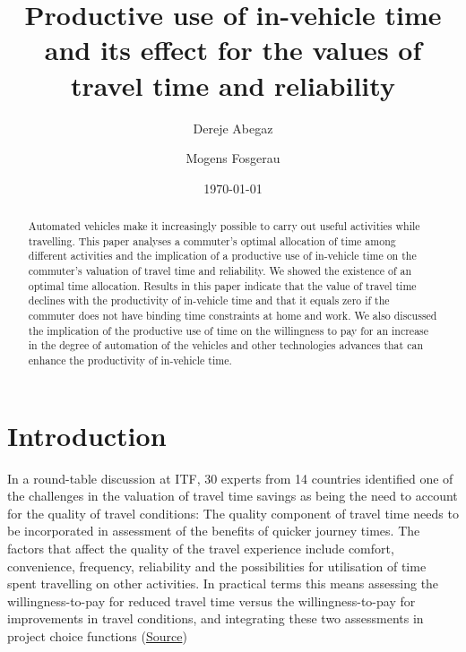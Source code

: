 \documentclass[12pt,a4paper,british]{article}
\begin{document}
\title{Productive use of in-vehicle time and its effect for the values of travel time and reliability}

\author{Dereje Abegaz \and Mogens Fosgerau}

\date{\today}

\maketitle

\begin{abstract}
Automated vehicles make it increasingly possible to carry out useful activities while travelling. This paper analyses a commuter's optimal allocation of time among different activities and the implication of a productive use of in-vehicle time on the commuter's valuation of travel time and reliability. We showed the existence of an optimal time allocation. Results in this paper indicate that the value of travel time declines with the productivity of in-vehicle time and that it equals zero if the commuter does not have binding time constraints at home and work. We also discussed the implication of the productive use of time on the willingness to pay for an increase in the degree of automation of the vehicles and other technologies advances that can enhance the productivity of in-vehicle time.
\end{abstract}

\section{Introduction}
\label{sec:introduction}


In a round-table discussion at ITF, 30 experts from 14 countries identified one of the challenges in the valuation of travel time savings as being the need to account for the quality of travel conditions: The quality component of travel time needs to be incorporated in assessment of the benefits of quicker journey times. The factors that affect the quality of the travel experience include comfort, convenience, frequency, reliability and the possibilities for utilisation of time spent travelling on other activities. In practical terms this means assessing the willingness-to-pay for reduced travel time versus the willingness-to-pay for improvements in travel conditions, and integrating these two assessments in project choice functions (\href{https://www.itf-oecd.org/sites/default/files/docs/value-saving-travel-time.pdf}{Source})
\end{document}
